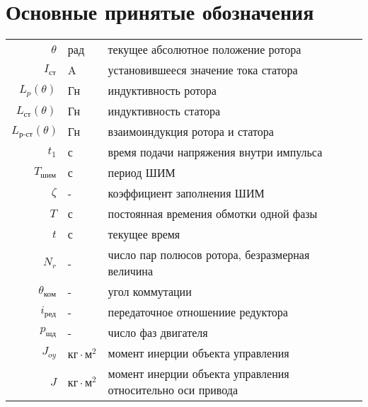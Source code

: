 \newpage
\section{Основные принятые обозначения}

\begin{table}[ht!]
    \begin{tabular}{rll}
    $\theta$            & рад & текущее абсолютное положение ротора \\

    $I_{\text{ст}}$     & A & установившееся значение тока статора \\

    $L_{p}(\theta)$     & Гн & индуктивность ротора \\

    $L_{\text{ст}}(\theta)$     & Гн & индуктивность статора \\

    $L_{\text{р-ст}}(\theta)$   & Гн & взаимоиндукция ротора и статора \\

    $t_{1}$             & с & время подачи напряжения внутри импульса \\

    $T_\text{шим}$      & с & период ШИМ \\

    $\zeta$             & - & коэффициент заполнения ШИМ \\

    $T$                 & с & постоянная времения обмотки одной фазы \\

    $t$                 & с & текущее время \\

    $N_{r}$             & - & число пар полюсов ротора, безразмерная величина \\

    $\theta_{\text{ком}}$& - & угол коммутации \\

    $i_\text{ред}$      & - & передаточное отношениие редуктора \\

    $p_{\text{шд}}$     & - & число фаз двигателя \\

    $J_{oy}$            & $\text{кг} \cdot \text{м}^{2}$ & момент инерции объекта управления \\

    $J$                 & $\text{кг} \cdot \text{м}^{2}$ & момент инерции объекта управления относительно оси привода \\


\end{tabular}
\end{table}
